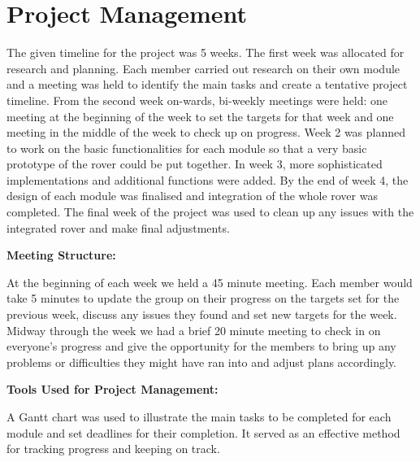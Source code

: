 \documentclass[10pt,twoside]{article}
\begin{document}


\newpage

\tableofcontents

\newpage
\section{Project Management}

The given timeline for the project was 5 weeks. The first week was allocated for research and planning. Each member carried out research on their own module and a meeting was held to identify the main tasks and create a tentative project timeline. From the second week on-wards, bi-weekly meetings were held: one meeting at the beginning of the week to set the targets for that week and one meeting in the middle of the week to check up on progress. Week 2 was planned to work on the basic functionalities for each module so that a very basic prototype of the rover could be put together. In week 3, more sophisticated implementations and additional functions were added. By the end of week 4, the design of each module was finalised and integration of the whole rover was completed. The final week of the project was used to clean up any issues with the integrated rover and make final adjustments. 

\textbf{Meeting Structure:}

At the beginning of each week we held a 45 minute meeting. Each member would take 5 minutes to update the group on their progress on the targets set for the previous week, discuss any issues they found and set new targets for the week. Midway through the week we had a brief 20 minute meeting to check in on everyone’s progress and give the opportunity for the members to bring up any problems or difficulties they might have ran into and adjust plans accordingly.

\textbf{Tools Used for Project Management:}

A Gantt chart was used to illustrate the main tasks to be completed for each module and set deadlines for their completion. It served as an effective method for tracking progress and keeping on track.
\end{document}
